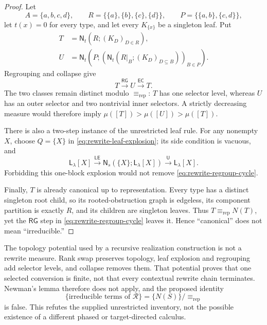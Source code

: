 \begin{proof}
Let
\[
 A=\{a,b,c,d\},\qquad
 R=\{\{a\},\{b\},\{c\},\{d\}\},\qquad
 P=\{\{a,b\},\{c,d\}\},
\]
let \(t(x)=0\) for every type, and let every \(K_{\{x\}}\) be a singleton
leaf.  Put
\begin{align*}
 T&=\mathsf N_t(R;(K_D)_{D\in R}),\\
 U&=\mathsf N_t\!\left(P;
       \left(\mathsf N_t(R|_B;(K_D)_{D\subseteq B})\right)_{B\in P}
     \right).
\end{align*}
Regrouping and collapse give
\begin{equation}
 T\xrightarrow{\mathsf{RG}}U
  \xrightarrow{\mathsf{EC}}T.
 \label{eq:rewrite-regroup-cycle}
\end{equation}
The two classes remain distinct modulo \(\equiv_{\mathrm{rep}}\): \(T\) has
one selector level, whereas \(U\) has an outer selector and two nontrivial
inner selectors.  A strictly decreasing measure would therefore imply
\(\mu([T])>\mu([U])>\mu([T])\).

There is also a two-step instance of the unrestricted leaf rule.  For any
nonempty \(X\), choose \(Q=\{X\}\) in
\autoref{eq:rewrite-leaf-explosion}; its side condition is vacuous, and
\begin{equation}
 \mathsf L_\lambda[X]
 \xrightarrow{\mathsf{LE}}
 \mathsf N_s(\{X\};\mathsf L_\lambda[X])
 \xrightarrow{\mathsf U}
 \mathsf L_\lambda[X].
 \label{eq:rewrite-leaf-cycle}
\end{equation}
Forbidding this one-block explosion would not remove
\autoref{eq:rewrite-regroup-cycle}.

Finally, \(T\) is already canonical up to representation.  Every type has a
distinct singleton root child, so its rooted-obstruction graph is edgeless,
its component partition is exactly \(R\), and its children are singleton
leaves.  Thus \(T\equiv_{\mathrm{rep}}N(T)\), yet the
\(\mathsf{RG}\) step in \autoref{eq:rewrite-regroup-cycle} leaves it.  Hence
``canonical'' does not mean ``irreducible.''
\end{proof}

The topology potential used by a recursive realization construction is not a
rewrite measure.  Rank swap preserves topology, leaf explosion and regrouping
add selector levels, and collapse removes them.  That potential proves that
one selected conversion is finite, not that every contextual rewrite chain
terminates.  Newman's lemma therefore does not apply, and the proposed
identity
\[
 \{\text{irreducible terms of }\mathcal R\}
   =\{N(S)\}/\!\equiv_{\mathrm{rep}}
\]
is false.  This refutes the supplied unrestricted inventory, not the possible
existence of a different phased or target-directed calculus.

